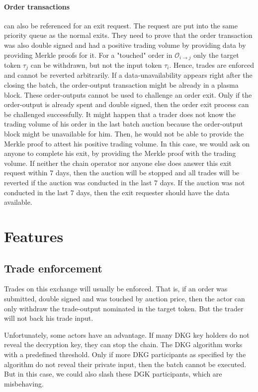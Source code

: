 \documentclass[11pt,parskip=full]{scrartcl}%
\def\pO{\mathcal{O}}
\def\ra{\rightarrow}
\begin{document}
\paragraph{Order transactions} can also be referenced for an exit request. The request are put into the same priority queue as the normal exits. They need to prove that the order transaction was also double signed and had a positive trading volume by providing data by providing Merkle proofs for it.
For a "touched" order in $\pO_{i\ra j}$ only the target token $\tau_j$ can be withdrawn, but not the input token $\tau_i$. 
Hence, trades are enforced and cannot be reverted arbitrarily. 
If a data-unavailability appears right after the closing the batch, the order-output transaction might be already in a plasma block. 
These order-outputs cannot be used to challenge an order exit. 
Only if the order-output is already spent and double signed, then the order exit process can be challenged successfully. 
It might happen that a trader does not know the trading volume of his order in the last batch auction because the order-output block might be unavailable for him. 
Then, he would not be able to provide the Merkle proof to attest his positive trading volume. 
In this case, we would ask on anyone to complete his exit, by providing the Merkle proof with the trading volume. 
If neither the chain operator nor anyone else does answer this exit request within 7 days, then the auction will be stopped and all trades will be reverted if the auction was conducted in the last 7 days. If the auction was not conducted in the last 7 days, then the exit requester should have the data available.


\newpage

\section{Features}

\subsection{Trade enforcement}
Trades on this exchange will usually be enforced. 
That is, if an order was submitted, double signed and was touched by auction price, then the actor can only withdraw the trade-output nominated in the target token. 
But the trader will not back his trade input. 

Unfortunately, some actors have an advantage.
If many DKG key holders do not reveal the decryption key, they can stop the chain. 
The DKG algorithm works with a predefined threshold. 
Only if more DKG participants as specified by the algorithm do not reveal their private input, then the batch cannot be executed. 
But in this case, we could also slash these DGK participants, which are misbehaving. 
\end{document}
